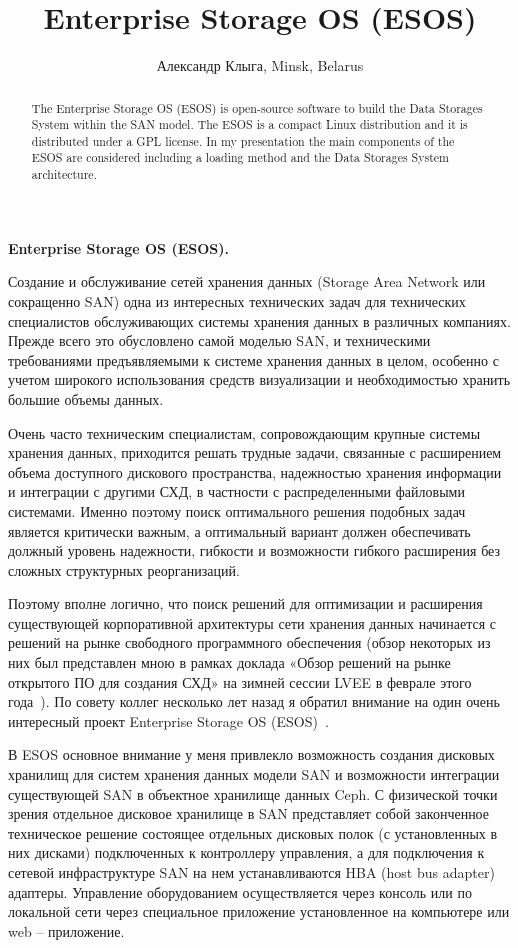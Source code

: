 \documentclass[10pt, a5paper]{article}
\begin{document}
\title{Enterprise Storage OS (ESOS)}
\author{Александр Клыга, Minsk, Belarus}
\maketitle
\begin{abstract}
The Enterprise Storage OS (ESOS) is open-source software to build the Data Storages System within the SAN model. The ESOS is a compact Linux distribution and it is distributed under a GPL license. In my presentation the main components of the ESOS are considered including a loading method and the Data Storages System architecture.
\end{abstract}
\textbf{Enterprise Storage OS (ESOS).}

Создание и обслуживание сетей хранения данных (Storage Area Network или сокращенно SAN) одна из интересных технических задач для технических специалистов обслуживающих системы хранения данных в различных компаниях. Прежде всего это обусловлено самой моделью SAN, и техническими требованиями предъявляемыми к системе хранения данных в целом, особенно с учетом широкого использования средств визуализации и необходимостью хранить большие объемы данных.

Очень часто техническим специалистам, сопровождающим крупные системы хранения данных, приходится решать трудные задачи, связанные с расширением объема доступного дискового пространства, надежностью хранения информации и интеграции с другими СХД, в частности с распределенными файловыми системами. Именно поэтому поиск оптимального решения подобных задач является критически важным, а оптимальный вариант должен обеспечивать должный уровень надежности, гибкости и возможности гибкого расширения без сложных структурных реорганизаций.

Поэтому вполне логично, что поиск решений для оптимизации и расширения существующей корпоративной архитектуры сети хранения данных начинается с решений на рынке свободного программного обеспечения (обзор некоторых из них был представлен мною в рамках доклада «Обзор решений на рынке открытого ПО для создания СХД» на зимней сессии LVEE в феврале этого года~\cite{Kliga1}). По совету коллег несколько лет назад я обратил внимание на один очень интересный проект  Enterprise Storage OS (ESOS)~\cite{Kliga2}.

В ESOS основное внимание у меня привлекло возможность создания дисковых хранилищ для систем хранения данных модели SAN и возможности интеграции существующей SAN в объектное хранилище данных Ceph. 
С физической точки зрения отдельное дисковое хранилище в SAN представляет собой законченное техническое решение состоящее отдельных дисковых полок (с установленных в них дисками)  подключенных к контроллеру управления, а для подключения к сетевой инфраструктуре SAN  на нем устанавливаются HBA (host bus adapter) адаптеры. Управление оборудованием осуществляется через консоль или по локальной сети \linebreak через специальное приложение установленное на компьютере или web – приложение.
\end{document}
